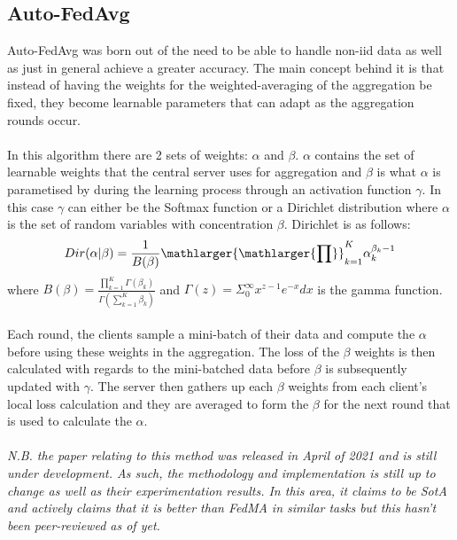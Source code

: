 \subsection{Auto-FedAvg}
Auto-FedAvg \cite{autofa} was born out of the need to be able to handle non-iid data as well as just in general achieve a greater accuracy.
The main concept behind it is that instead of having the weights for the weighted-averaging of the aggregation be fixed, they become learnable parameters that can adapt as the aggregation rounds occur.
\\ \\
In this algorithm there are 2 sets of weights: $\alpha$ and $\beta$.
$\alpha$ contains the set of learnable weights that the central server uses for aggregation and $\beta$ is what $\alpha$ is parametised by during the learning process through an activation function $\gamma$.
In this case $\gamma$ can either be the Softmax function or a Dirichlet distribution where $\alpha$ is the set of random variables with concentration $\beta$. 
Dirichlet is as follows:
\begin{equation}
    Dir(\alpha | \beta) = \dfrac{1}{B(\beta)} \mathlarger{\mathlarger{\prod}}_{k=1}^{K} \alpha_k^{\beta_k-1}
\end{equation}
where $B(\beta) = \frac{\prod_{k=1}^K \Gamma(\beta_k)}{\Gamma (\sum_{k=1}^K \beta_k)}$ and $\Gamma(z) = \Sigma_0^\infty x^{z-1} e^{-x} dx$ is the gamma function.
\\ \\
Each round, the clients sample a mini-batch of their data and compute the $\alpha$ before using these weights in the aggregation.
The loss of the $\beta$ weights is then calculated with regards to the mini-batched data before $\beta$ is subsequently updated with $\gamma$.
The server then gathers up each $\beta$ weights from each client's local loss calculation and they are averaged to form the $\beta$ for the next round that is used to calculate the $\alpha$.
\\ \\
\textit{N.B. the paper relating to this method \cite{autofa} was released in April of 2021 and is still under development. As such, the methodology and implementation is still up to change as well as their experimentation results. In this area, it claims to be SotA and actively claims that it is better than FedMA in similar tasks but this hasn't been peer-reviewed as of yet.}